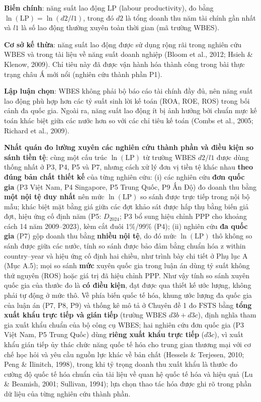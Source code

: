 \documentclass[
  a4paper,
  13pt]{extreport}
\begin{document}
\textbf{Biến chính}: năng suất lao động \(\mathrm{LP}\) (labour
productivity), đo bằng \(\ln(\mathrm{LP}) = \ln(d2/l1)\), trong đó
\(d2\) là tổng doanh thu năm tài chính gần nhất và \(l1\) là số lao động
thường xuyên toàn thời gian (mã trường WBES).

\textbf{Cơ sở kế thừa}: năng suất lao động được sử dụng rộng rãi trong
nghiên cứu WBES và trong tài liệu về năng suất doanh nghiệp (Bloom et
al., 2012; Hsieh \& Klenow, 2009). Chỉ tiêu này đã được vận hành hóa
thành công trong bài thực trạng châu Á mới nổi (nghiên cứu thành phần
P1).

\textbf{Lập luận chọn}: WBES không phải bộ báo cáo tài chính đầy đủ, nên
năng suất lao động phù hợp hơn các tỷ suất sinh lời kế toán (ROA, ROE,
ROS) trong bối cảnh đa quốc gia. Ngoài ra, năng suất lao động ít bị ảnh
hưởng bởi chuẩn mực kế toán khác biệt giữa các nước hơn so với các chỉ
tiêu kế toán (Combs et al., 2005; Richard et al., 2009).

\textbf{Nhất quán đo lường xuyên các nghiên cứu thành phần và điều kiện
so sánh tiền tệ}: cùng một cấu trúc \(\ln(\mathrm{LP})\) từ trường WBES
\(d2/l1\) được dùng thống nhất ở P3, P4, P5 và P7, nhưng cách xử lý đơn
vị tiền tệ khác nhau \textbf{theo đúng bản chất thiết kế} của từng
nghiên cứu: (i) các nghiên cứu \textbf{đơn quốc gia} (P3 Việt Nam, P4
Singapore, P5 Trung Quốc, P9 Ấn Độ) đo doanh thu bằng \textbf{một nội tệ
duy nhất} nên mức \(\ln(\mathrm{LP})\) so sánh được trực tiếp trong nội
bộ mẫu; khác biệt mặt bằng giá giữa các đợt khảo sát được hấp thụ bằng
biến giả đợt, hiệu ứng cố định năm (P5: \(D_{2024}\); P3 bổ sung hiệu
chỉnh PPP cho khoảng cách 14 năm 2009--2023), kèm cắt đuôi 1\%/99\%
(P4); (ii) nghiên cứu \textbf{đa quốc gia} (P7) gộp doanh thu bằng
\textbf{nhiều nội tệ}, do đó mức \(\ln(\mathrm{LP})\) thô không so sánh
được giữa các nước, tính so sánh được bảo đảm bằng chuẩn hóa z within
country--year và hiệu ứng cố định hai chiều, như trình bày chi tiết ở
Phụ lục A (Mục A.5); mọi so sánh \textbf{mức} xuyên quốc gia trong luận
án dùng tỷ suất không thứ nguyên (ROS) hoặc giá trị đã hiệu chỉnh PPP.
Như vậy tính so sánh xuyên quốc gia của thước đo là \textbf{có điều
kiện}, đạt được qua thiết kế ước lượng, không phải tự động ở mức thô. Về
phía biến quốc tế hóa, khung ước lượng đa quốc gia của luận án (P7, P8,
P9) và thống kê mô tả ở Chuyên đề 1 đo \(\mathrm{FSTS}\) bằng
\textbf{tổng xuất khẩu trực tiếp và gián tiếp} (trường WBES
\(d3b + d3c\)), định nghĩa tham gia xuất khẩu chuẩn của bộ công cụ WBES;
hai nghiên cứu đơn quốc gia (P3 Việt Nam, P5 Trung Quốc) dùng
\textbf{riêng xuất khẩu trực tiếp} (\(d3c\)), vì xuất khẩu gián tiếp ủy
thác chức năng quốc tế hóa cho trung gian thương mại với cơ chế học hỏi
và yêu cầu nguồn lực khác về bản chất (Hessels \& Terjesen, 2010; Peng
\& Ilinitch, 1998), trong khi tỷ trọng doanh thu xuất khẩu là thước đo
cường độ quốc tế hóa chuẩn của tài liệu về quan hệ quốc tế hóa và hiệu
quả (Lu \& Beamish, 2001; Sullivan, 1994); lựa chọn thao tác hóa được
ghi rõ trong phần dữ liệu của từng nghiên cứu thành phần.
\end{document}
